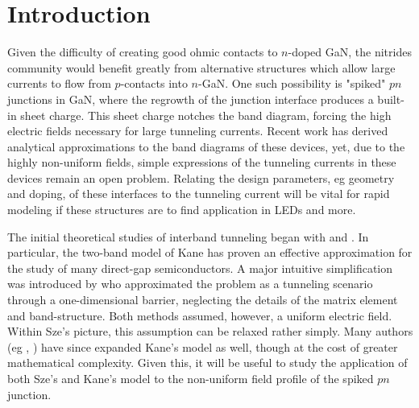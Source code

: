 \section{Introduction}
Given the difficulty of creating good ohmic contacts to $n$-doped GaN, the nitrides community would benefit greatly from alternative structures which allow large currents to flow from $p$-contacts into $n$-GaN.  One such possibility is "spiked" $pn$ junctions in GaN, where the regrowth of the junction interface produces a built-in sheet charge.  This sheet charge notches the band diagram, forcing the high electric fields necessary for large tunneling currents.  Recent work has derived analytical approximations to the band diagrams of these devices, yet, due to the highly non-uniform fields, simple expressions of the tunneling currents in these devices remain an open problem.  Relating the design parameters, eg geometry and doping, of these interfaces to the tunneling current will be vital for rapid modeling if these structures are to find application in LEDs and more.

The initial theoretical studies of interband tunneling began with \cite{Keldysh_1958} and \cite{Kane_1960}.  In particular, the two-band model of Kane has proven an effective approximation for the study of many direct-gap semiconductors.  A major intuitive simplification was introduced by \cite{Sze_2nd} who approximated the problem as a tunneling scenario through a one-dimensional barrier, neglecting the details of the matrix element and band-structure.  Both methods assumed, however, a uniform electric field. Within Sze's picture, this assumption can be relaxed rather simply.  Many authors (eg \cite{Takayanagi_1991}, \cite{Tanaka_1994}) have since expanded Kane's model as well, though at the cost of greater mathematical complexity.  Given this, it will be useful to study the application of both Sze's and Kane's model to the non-uniform field profile of the spiked $pn$ junction.